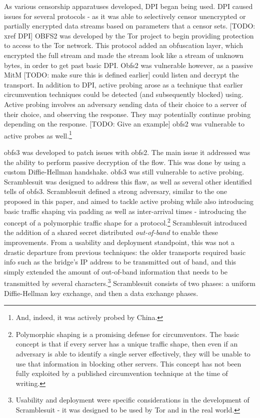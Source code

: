 \documentclass[12pt]{report}
\begin{document}
As various censorship apparatuses developed, DPI began being used. DPI caused issues for several protocols - as it was able to selectively censor unencrypted or partially encrypted data streams based on parameters that a censor sets. [TODO: xref DPI] OBFS2 was developed by the Tor project to begin providing protection to access to the Tor network.\cite{obfs2} This protocol added an obfuscation layer, which encrypted the full stream and made the stream look like a stream of unknown bytes, in order to get past basic DPI. Obfs2 was vulnerable however, as a passive MitM [TODO: make sure this is defined earlier] could listen and decrypt the transport.\cite{obfs3} In addition to DPI, active probing arose as a technique that earlier circumvention techniques could be detected (and subsequently blocked) using. Active probing involves an adversary sending data of their choice to a server of their choice, and observing the response. They may potentially continue probing depending on the response. [TODO: Give an example] obfs2 was vulnerable to active probes as well.\footnote{And, indeed, it was actively probed by China.\cite{TODO https://gitlab.torproject.org/legacy/trac/-/issues/8591}}

obfs3 was developed to patch issues with obfs2. The main issue it addressed was the ability to perform passive decryption of the flow. This was done by using a custom Diffie-Hellman handshake.\cite{obfs3} obfs3 was still vulnerable to active probing.\cite{scramblesuit} Scramblesuit was designed to address this flaw, as well as several other identified tells of obfs3.\cite{scramblesuit} Scramblesuit defined a strong adversary, similar to the one proposed in this paper, and aimed to tackle active probing while also introducing basic traffic shaping via padding as well as inter-arrival times - introducing the concept of a polymorphic traffic shape for a protocol.\footnote{Polymorphic shaping is a promising defense for circumventors. The basic concept is that if every server has a unique traffic shape, then even if an adversary is able to identify a single server effectively, they will be unable to use that information in blocking other servers. This concept has not been fully exploited by a published circumvention technique at the time of writing.} Scramblesuit introduced the addition of a shared secret distributed \emph{out-of-band} to enable these improvements. From a usability and deployment standpoint, this was not a drastic departure from previous techniques: the older transports required basic info such as the bridge's IP address to be transmitted out of band, and this simply extended the amount of out-of-band information that needs to be transmitted by several characters.\footnote{Usability and deployment were specific considerations in the development of Scramblesuit - it was designed to be used by Tor and in the real world.\cite{scramblesuit}} Scramblesuit consists of two phases: a uniform Diffie-Hellman key exchange, and then a data exchange phases.
\end{document}

